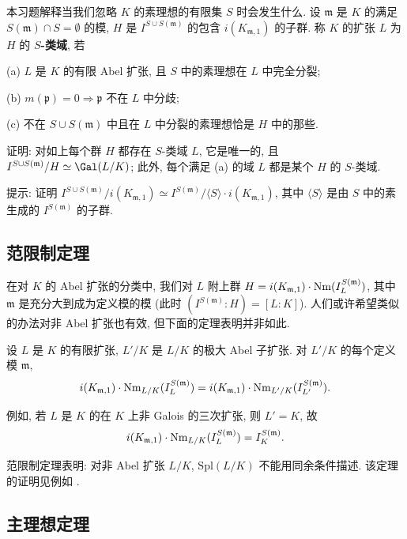 \begin{exercise}\label{exc:v.3.15}
本习题解释当我们忽略 $K$ 的素理想的有限集 $S$ 时会发生什么. 设 $\mathfrak{m}$ 是 $K$ 的满足 $S(\mathfrak{m})\cap S=\emptyset$ 的模, $H$ 是 $I^{S\cup S(\mathfrak{m})}$ 的包含 $i(K_{\mathfrak{m},1})$ 的子群. 称 $K$ 的扩张 $L$ 为 $H$ 的 \textbf{$S$-类域}, 若

(a) $L$ 是 $K$ 的有限 Abel 扩张, 且 $S$ 中的素理想在 $L$ 中完全分裂;

(b) $m(\mathfrak{p})=0\Rightarrow\mathfrak{p}$ 不在 $L$ 中分歧;

(c) 不在 $S\cup S(\mathfrak{m})$ 中且在 $L$ 中分裂的素理想恰是 $H$ 中的那些.

证明: 对如上每个群 $H$ 都存在 $S$-类域 $L$, 它是唯一的, 且 $I^{S\cup S(\mathfrak{m})}/H\simeq\Gal(L/K)$; 此外, 每个满足 (a) 的域 $L$ 都是某个 $H$ 的 $S$-类域.

提示: 证明 $I^{S\cup S(\mathfrak{m})}/i(K_{\mathfrak{m},1})\simeq I^{S(\mathfrak{m})}/\langle S\rangle\cdot i(K_{\mathfrak{m},1})$, 其中 $\langle S\rangle$ 是由 $S$ 中的素生成的 $I^{S(\mathfrak{m})}$ 的子群.
\end{exercise}

\subsection*{范限制定理}

在对 $K$ 的 Abel 扩张的分类中, 我们对 $L$ 附上群 $H=i(K_{\mathfrak{m},1})\cdot\operatorname{Nm}(I_L^{S(\mathfrak{m})})$, 其中 $\mathfrak{m}$ 是充分大到成为定义模的模 (此时 $(I^{S(\mathfrak{m})}:H)=[L:K]$). 人们或许希望类似的办法对非 Abel 扩张也有效, 但下面的定理表明并非如此.

\begin{theorem}[范限制定理]\label{thm:v.3.16}
设 $L$ 是 $K$ 的有限扩张, $L'/K$ 是 $L/K$ 的极大 Abel 子扩张. 对 $L'/K$ 的每个定义模 $\mathfrak{m}$,
\[
i(K_{\mathfrak{m},1})\cdot\operatorname{Nm}_{L/K}(I_L^{S(\mathfrak{m})})=i(K_{\mathfrak{m},1})\cdot\operatorname{Nm}_{L'/K}(I_{L'}^{S(\mathfrak{m})}).
\]
\end{theorem}

例如, 若 $L$ 是 $K$ 的在 $K$ 上非 Galois 的三次扩张, 则 $L'=K$, 故
\[
i(K_{\mathfrak{m},1})\cdot\operatorname{Nm}_{L/K}(I_L^{S(\mathfrak{m})})=I_K^{S(\mathfrak{m})}.
\]

范限制定理表明: 对非 Abel 扩张 $L/K$, $\mathrm{Spl}(L/K)$ 不能用同余条件描述. 该定理的证明见例如 \cite{GrantLeitzel1969}.

\subsection*{主理想定理}


